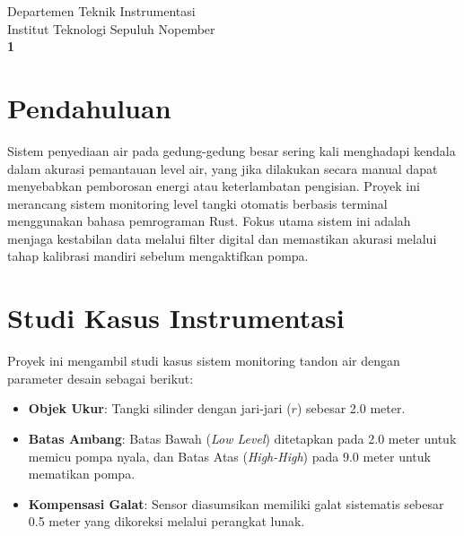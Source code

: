 \documentclass[12pt,a4paper]{article}
\begin{document}
\begin{titlepage}
    \vfill
    
    {\large Departemen Teknik Instrumentasi} \\[0.1cm]
    {\large Institut Teknologi Sepuluh Nopember} \\[1cm]
    
    \textbf{1} 
\end{titlepage}

\newpage
\tableofcontents
\newpage


\section{Pendahuluan}
Sistem penyediaan air pada gedung-gedung besar sering kali menghadapi kendala dalam akurasi pemantauan level air, yang jika dilakukan secara manual dapat menyebabkan pemborosan energi atau keterlambatan pengisian. Proyek ini merancang sistem monitoring level tangki otomatis berbasis terminal menggunakan bahasa pemrograman Rust. Fokus utama sistem ini adalah menjaga kestabilan data melalui filter digital dan memastikan akurasi melalui tahap kalibrasi mandiri sebelum mengaktifkan pompa.

\section{Studi Kasus Instrumentasi}
Proyek ini mengambil studi kasus sistem monitoring tandon air dengan parameter desain sebagai berikut:
\begin{itemize}
    \item \textbf{Objek Ukur}: Tangki silinder dengan jari-jari ($r$) sebesar 2.0 meter.
    \item \textbf{Batas Ambang}: Batas Bawah (\textit{Low Level}) ditetapkan pada 2.0 meter untuk memicu pompa nyala, dan Batas Atas (\textit{High-High}) pada 9.0 meter untuk mematikan pompa.
    \item \textbf{Kompensasi Galat}: Sensor diasumsikan memiliki galat sistematis sebesar 0.5 meter yang dikoreksi melalui perangkat lunak.
\end{itemize}
\end{document}
